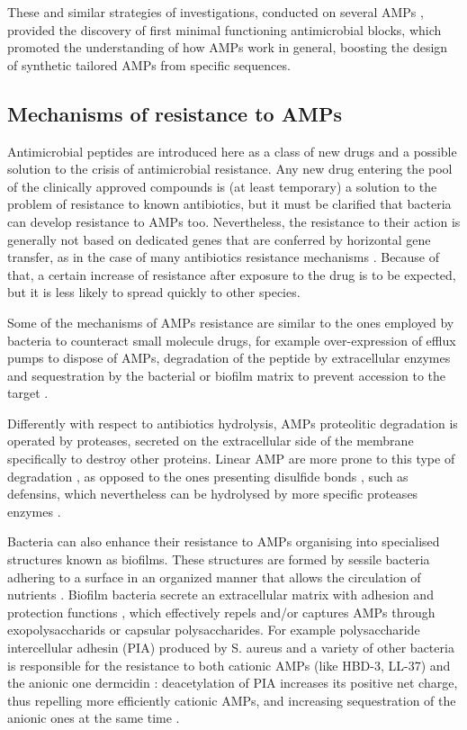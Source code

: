 These and similar strategies of investigations, conducted on several AMPs \cite{???}, provided the discovery of first minimal functioning antimicrobial blocks, which promoted the understanding of how AMPs work in general, boosting the design of synthetic tailored AMPs from specific sequences.


\subsection{Mechanisms of resistance to AMPs}

Antimicrobial peptides are introduced here as a class of new drugs and a possible solution to the crisis of antimicrobial resistance. Any new drug entering the pool of the clinically approved compounds is (at least temporary) a solution to the problem of resistance to known antibiotics, but it must be clarified that bacteria can develop resistance to AMPs too.
%
Nevertheless, the resistance to their action is generally not based on dedicated genes that are conferred by horizontal gene transfer, as in the case of many antibiotics resistance mechanisms \cite{Peschel2006}. Because of that, a certain increase of resistance after exposure to the drug is to be expected, but it is less likely to spread quickly to other species.

Some of the mechanisms of AMPs resistance are similar to the ones employed by bacteria to counteract small molecule drugs, for example over-expression of efflux pumps to dispose of AMPs, degradation of the peptide by extracellular enzymes and sequestration by the bacterial or biofilm matrix to prevent accession to the target \cite{Peschel2006}.

Differently with respect to antibiotics hydrolysis, AMPs proteolitic degradation is operated by proteases, secreted on the extracellular side of the membrane specifically to destroy other proteins. Linear AMP are more prone to this type of degradation \cite{Sieprawska-Lupa2004}, as opposed to the ones presenting disulfide bonds \cite{Peschel2006}, such as defensins, which nevertheless can be hydrolysed by more specific proteases enzymes \cite{Nelson2011}.

Bacteria can also enhance their resistance to AMPs organising into specialised structures known as biofilms. These structures are formed by sessile bacteria adhering to a surface in an organized manner that allows the circulation of nutrients \cite{Costerton1999}.
%
Biofilm bacteria secrete an extracellular matrix with adhesion and protection functions \cite{Jolivet-Gougeon2014}, which effectively repels and/or captures AMPs through exopolysaccharids or capsular polysaccharides.
%
For example polysaccharide intercellular adhesin (PIA) produced by S. aureus and a variety of other bacteria is responsible for the resistance to both cationic AMPs (like HBD-3, LL-37) and the anionic one dermcidin \cite{Vuong2004PIA}: deacetylation of PIA increases its positive net charge, thus repelling more efficiently cationic AMPs, and increasing sequestration of the anionic ones at the same time \cite{Vuong2004}.


